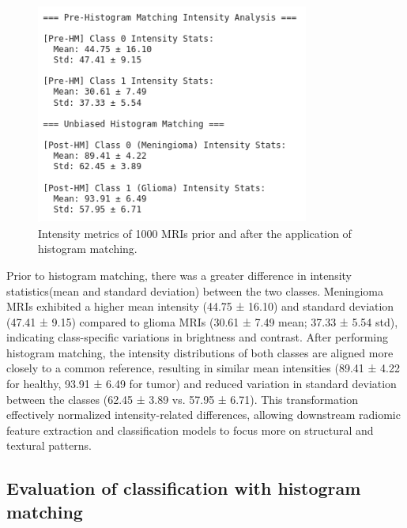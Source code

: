 \documentclass[11pt,a4paper]{article}
\begin{document}
		\begin{figure}[H]
			\centering
			\includegraphics[width=0.8\textwidth]{images/pre_hm_stats.png}
			\caption{Intensity metrics of 1000 MRIs prior and after the application of histogram matching.}
			\label{fig1:}
		\end{figure}		

Prior to histogram matching, there was a greater difference in intensity statistics(mean and standard deviation)
between the two classes. 
Meningioma MRIs exhibited a higher mean intensity (44.75 ± 16.10) and 
standard deviation (47.41 ± 9.15) compared to glioma MRIs (30.61 ± 7.49 mean; 37.33 ± 5.54 std), 
indicating class-specific variations in brightness and contrast. 
After performing histogram matching, the intensity distributions of both classes are aligned more closely 
to a common reference, resulting in similar mean intensities (89.41 ± 4.22 for healthy, 93.91 ± 6.49 for tumor) 
and reduced variation in standard deviation between the classes (62.45 ± 3.89 vs. 57.95 ± 6.71). 
This transformation effectively normalized intensity-related differences, allowing downstream radiomic feature 
extraction and classification models to focus more on structural and textural patterns.


\subsection{Evaluation of classification with histogram matching}
\end{document}
